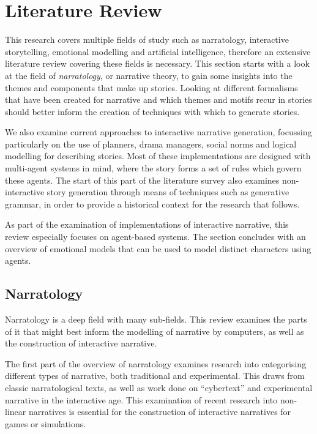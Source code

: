 \documentclass[11pt]{report}
\begin{document}



\chapter{Literature Review}
\label{cha:literature-review}


This research covers multiple fields of study such as narratology, interactive
storytelling, emotional modelling and artificial intelligence, therefore an extensive
literature review covering these fields is necessary. This section starts with a
look at the field of \emph{narratology}, or narrative theory, to gain some
insights into the themes and components that make up stories. Looking at
different formalisms that have been created for narrative and which themes and
motifs recur in stories should better inform the creation of techniques with
which to generate stories.

We also examine current approaches to interactive narrative generation,
focussing particularly on the use of planners, drama managers, social norms and
logical modelling for describing stories. Most of these implementations are
designed with multi-agent systems in mind, where the story forms a set of rules
which govern these agents. The start of this part of the literature survey also
examines non-interactive story generation through means of techniques such as
generative grammar, in order to provide a historical context for the research
that follows. 

As part of the examination of implementations of interactive narrative, this review especially focuses on agent-based systems. The section concludes with an overview of emotional models that can be used to model distinct characters using agents.

\section{Narratology}
\label{sec:narratology}
Narratology is a deep field with many sub-fields. This review examines the parts of it that might best inform the modelling of narrative by computers, as well as the construction of interactive narrative.

The first part of the overview of narratology examines research into categorising different types of narrative, both traditional and experimental.
This draws from classic narratological texts, as well as work done on
``cybertext'' and experimental narrative in the interactive age. This
examination of recent research into non-linear narratives is essential for the
construction of interactive narratives for games or simulations.
\end{document}
